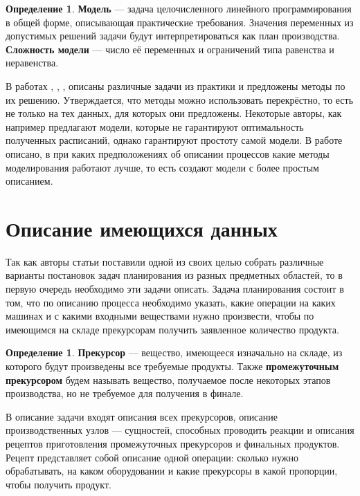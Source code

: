 \documentclass[12pt, twoside]{article}
\theoremstyle{definition}
\newtheorem{definition}[section]{Определение}
\begin{document}
\begin{definition} \textbf{Модель} --- задача целочисленного линейного программирования в общей форме, описывающая практические требования. Значения переменных из допустимых решений задачи будут интерпретироваться как план производства. \textbf{Сложность модели} --- число её переменных и ограничений типа равенства и неравенства.
\end{definition}

В работах \cite{lpheuristic}, \cite{dairy}, \cite{discretetime}, \cite{hybridizing} описаны различные задачи из практики и предложены методы по их решению. Утверждается, что методы можно использовать перекрёстно, то есть не только на тех данных, для которых они предложены. Некоторые авторы, как например \cite{lpheuristic} предлагают модели, которые не гарантируют оптимальность полученных расписаний, однако гарантируют простоту самой модели. В работе описано, в при каких предположениях об описании процессов какие методы моделирования работают лучше, то есть создают модели с более простым описанием. 

\section{Описание имеющихся данных}
Так как авторы статьи поставили одной из своих целью собрать различные варианты постановок задач планирования из разных предметных областей, то в первую очередь необходимо эти задачи описать. Задача планирования состоит в том, что по описанию процесса необходимо указать, какие операции на каких машинах и с какими входными веществами нужно произвести, чтобы по имеющимся на складе прекурсорам получить заявленное количество продукта.

\begin{definition} \textbf{Прекурсор} --- вещество, имеющееся изначально на складе, из которого будут произведены все требуемые продукты. Также \textbf{промежуточным прекурсором} будем называть вещество, получаемое после некоторых этапов производства, но не требуемое для получения в финале.
\end{definition}

В описание задачи входят описания всех прекурсоров, описание производственных узлов --- сущностей, способных проводить реакции и описания рецептов приготовления промежуточных прекурсоров и финальных продуктов. Рецепт представляет собой описание одной операции: сколько нужно обрабатывать, на каком оборудовании и какие прекурсоры в какой пропорции, чтобы получить продукт. 
\end{document}
